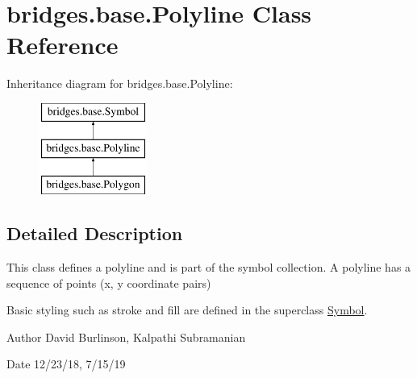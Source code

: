 \hypertarget{classbridges_1_1base_1_1_polyline}{}\section{bridges.\+base.\+Polyline Class Reference}
\label{classbridges_1_1base_1_1_polyline}
Inheritance diagram for bridges.\+base.\+Polyline\+:\begin{figure}[H]
\begin{center}
\leavevmode
\includegraphics[height=3.000000cm]{classbridges_1_1base_1_1_polyline}
\end{center}
\end{figure}


\subsection{Detailed Description}
This class defines a polyline and is part of the symbol collection. A polyline has a sequence of points (x, y coordinate pairs) 

Basic styling such as stroke and fill are defined in the superclass \mbox{\hyperlink{classbridges_1_1base_1_1_symbol}{Symbol}}.

\begin{DoxyAuthor}{Author}
David Burlinson, Kalpathi Subramanian 
\end{DoxyAuthor}
\begin{DoxyDate}{Date}
12/23/18, 7/15/19 
\end{DoxyDate}
